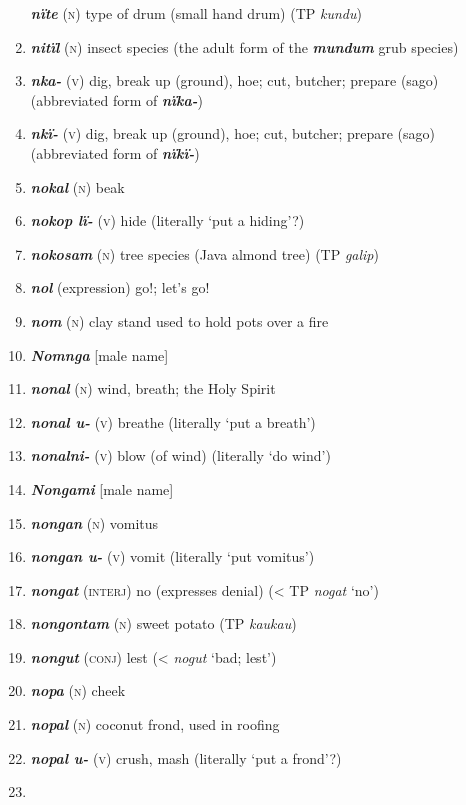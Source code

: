 \begin{enumerate}[noitemsep, label={}, align=left, widest=190, labelsep=1ex,leftmargin=*,itemindent=-10pt]
\textbf{\textit{nïte}} (\textsc{n}) type of drum (small hand drum) (TP \textit{kundu}) \item 
\textbf{\textit{nitïl}} (\textsc{n}) insect species (the adult form of the \textbf{\textit{mundum}} grub species) \item 
\textbf{\textit{nka-}} (\textsc{v}) dig, break up (ground), hoe; cut, butcher; prepare (sago) (abbreviated form of \textbf{\textit{nïka-}}) \item 
\textbf{\textit{nkï-}} (\textsc{v}) dig, break up (ground), hoe; cut, butcher; prepare (sago) (abbreviated form of \textbf{\textit{nïkï-}}) \item 
\textbf{\textit{nokal}} (\textsc{n}) beak \item 
\textbf{\textit{nokop lï-}} (\textsc{v}) hide (literally ‘put a hiding’?) \item 
\textbf{\textit{nokosam}} (\textsc{n}) tree species (Java almond tree) (TP \textit{galip}) \item 
\textbf{\textit{nol}} (expression) go!; let’s go! \item 
\textbf{\textit{nom}} (\textsc{n}) clay stand used to hold pots over a fire \item 
\textbf{\textit{Nomnga}} [male name] \item 
\textbf{\textit{nonal}} (\textsc{n}) wind, breath; the Holy Spirit \item 
\textbf{\textit{nonal u-}} (\textsc{v}) breathe (literally ‘put a breath’) \item 
\textbf{\textit{nonalni-}} (\textsc{v}) blow (of wind) (literally ‘do wind’) \item 
\textbf{\textit{Nongami}} [male name] \item 
\textbf{\textit{nongan}} (\textsc{n}) vomitus \item 
\textbf{\textit{nongan u-}} (\textsc{v}) vomit (literally ‘put vomitus’) \item 
\textbf{\textit{nongat}} (\textsc{interj)} no (expresses denial) (< TP \textit{nogat} ‘no’) \item 
\textbf{\textit{nongontam}} (\textsc{n}) sweet potato (TP \textit{kaukau}) \item 
\textbf{\textit{nongut}} (\textsc{conj}) lest (<  \textit{nogut} ‘bad; lest') \item 
\textbf{\textit{nopa}} (\textsc{n}) cheek \item 
\textbf{\textit{nopal}} (\textsc{n}) coconut frond, used in roofing \item 
\textbf{\textit{nopal u-}} (\textsc{v}) crush, mash (literally ‘put a frond’?) \item 

\end{enumerate}
